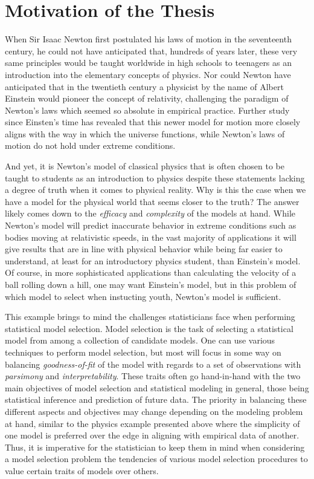 \doublespace
{}
		\section{Motivation of the Thesis}
		When Sir Isaac Newton first postulated his laws of motion in the seventeenth century, he could not have anticipated that, hundreds of years later, these very same principles would
		be taught worldwide in high schools to teenagers as an introduction into the elementary concepts of physics. Nor could Newton have anticipated that in the twentieth century a
		physicist by the name of Albert Einstein would pioneer the concept of relativity, challenging the paradigm of Newton's laws which seemed so absolute in empirical practice. Further study
		since Einsten's time has revealed that this newer model for motion more closely aligns with the way in which the universe functions, while Newton's laws of motion do not hold
		under extreme conditions.

		And yet, it is Newton's model of classical physics that is often chosen to be taught to students as an introduction to physics despite these statements lacking a degree of truth when
		it comes to physical reality. Why is this the case when we have a model for the physical world that seems closer to the truth? The answer likely comes down to the \textit{efficacy} and
		\textit{complexity} of the models at hand. While Newton's model will predict inaccurate behavior in extreme conditions such as bodies moving at relativistic speeds, in the
		vast majority of applications it will give results that are in line with physical behavior while being far easier to understand, at least for an introductory physics student, than 
		Einstein's model. Of course, in more sophisticated applications than calculating the velocity of a ball rolling down a hill, one may want Einstein's model, but in this problem of 
		which model to select when instucting youth, Newton's model is sufficient.

		This example brings to mind the challenges statisticians face when performing statistical model selection. Model selection is the task of selecting a statistical model from among a
		collection of candidate models. One can use various techniques to perform model selection, but most will focus in some way on balancing \textit{goodness-of-fit} of the model with
		regards to a set of observations with \textit{parsimony} and \textit{interpretability}. These traits often go hand-in-hand with the two main objectives of model selection and 
		statistical modeling in general, those being statistical inference and prediction of future data. The priority in balancing these different aspects and objectives may change depending
		on the modeling problem at hand, similar to the physics example presented above where the simplicity of one model is preferred over the edge in aligning with empirical data of another.
		Thus, it is imperative for the statistician to keep them in mind when considering a model selection problem the tendencies of various model selection procedures to value certain
		traits of models over others.

